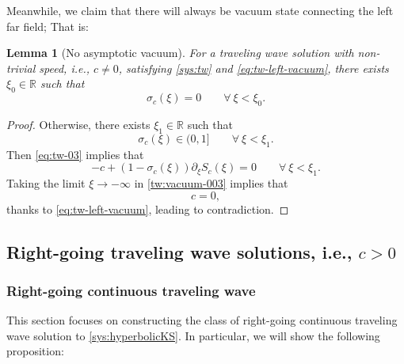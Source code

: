 \documentclass[12pt]{article}
\newtheorem{lemma}[theorem]{Lemma}
\theoremstyle{definition}
\theoremstyle{remark}
\numberwithin{equation}{section}
\begin{document}
Meanwhile, we claim that there will always be vacuum state connecting the left far field; That is:
\begin{lemma}[No asymptotic vacuum]
\label{lm:no-asymptotic-vaccum}
    For a traveling wave solution with non-trivial speed, i.e., $ c \neq 0 $, satisfying \eqref{sys:tw} and \eqref{eq:tw-left-vacuum}, there exists $ \xi_0 \in \mathbb R $ such that
\begin{equation}
    \label{tw:vacuum-001}
    \sigma_c(\xi) = 0 \qquad \forall \ \xi < \xi_0. 
\end{equation}
\end{lemma}
\begin{proof}
Otherwise, there exists $ \xi_1 \in \mathbb R $ such that 
\begin{equation}
    \label{tw:vacuum-002}
    \sigma_c(\xi) \in (0,1] \qquad \forall \ \xi < \xi_1. 
\end{equation}
Then \eqref{eq:tw-03} implies that 
\begin{equation}
    \label{tw:vacuum-003}
    - c + (1-\sigma_c(\xi))\partial_\xi S_c(\xi) = 0 \qquad \forall \ \xi < \xi_1. 
\end{equation}
Taking the limit $ \xi \to -\infty $ in \eqref{tw:vacuum-003} implies that 
\begin{equation}
    c = 0, 
\end{equation}
thanks to \eqref{eq:tw-left-vacuum}, leading to contradiction. 
\end{proof}

\subsection{Right-going traveling wave solutions, i.e., $ c > 0 $}
\label{subsec:right-going-traveling-wave}

\subsubsection{Right-going continuous traveling wave}
\label{subsubsec:rg-continous-tw}

This section focuses on constructing the class of right-going continuous traveling wave solution to \eqref{sys:hyperbolicKS}. In particular, we will show the following proposition:
\end{document}
